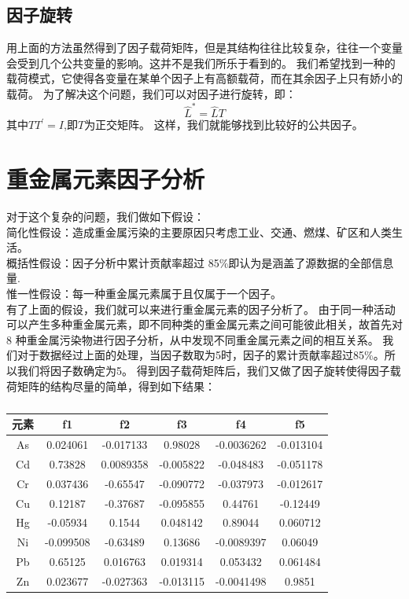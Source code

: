 \documentclass[a4paper]{article}
\begin{document}
\subsection{因子旋转}
用上面的方法虽然得到了因子载荷矩阵，但是其结构往往比较复杂，往往一个变量会受到几个公共变量的影响。这并不是我们所乐于看到的。
我们希望找到一种的载荷模式，它使得各变量在某单个因子上有高额载荷，而在其余因子上只有娇小的载荷。
为了解决这个问题，我们可以对因子进行旋转，即：
\begin{equation}
\hat L^* = \hat LT
\end{equation}
其中$TT^{\prime}=I$,即$T$为正交矩阵。
这样，我们就能够找到比较好的公共因子。
\section{重金属元素因子分析}
对于这个复杂的问题，我们做如下假设：\\
简化性假设：造成重金属污染的主要原因只考虑工业、交通、燃煤、矿区和人类生
活。\\
概括性假设：因子分析中累计贡献率超过 85\%即认为是涵盖了源数据的全部信息量. \\
惟一性假设：每一种重金属元素属于且仅属于一个因子。\\
\indent 有了上面的假设，我们就可以来进行重金属元素的因子分析了。
由于同一种活动可以产生多种重金属元素，即不同种类的重金属元素之间可能彼此相关，故首先对 8 种重金属污染物进行因子分析，从中发现不同重金属元素之间的相互关系。
我们对于数据经过上面的处理，当因子数取为5时，因子的累计贡献率超过85\%。所以我们将因子数确定为5。
得到因子载荷矩阵后，我们又做了因子旋转使得因子载荷矩阵的结构尽量的简单，得到如下结果：
\begin{table}[H]
		\centering
		\caption{}
		\label{average-contend}
		\begin{tabular}{c|ccccc}
			元素	  &   f1   &  f2  &   f3 &   f4  &   f5   \\
			\hline
			 As   &  0.024061 &   -0.017133  &    0.98028  &  -0.0036262  &  -0.013104    \\
    			 Cd   &   0.73828 &   0.0089358  &  -0.005822  &   -0.048483  &  -0.051178    \\  
    			 Cr   &  0.037436 &    -0.65547  &  -0.090772  &   -0.037973  &  -0.012617    \\
    			 Cu   &   0.12187 &    -0.37687  &  -0.095855  &     0.44761  &   -0.12449    \\
   			 Hg   &  -0.05934 &      0.1544  &   0.048142  &     0.89044  &   0.060712    \\
   			 Ni   & -0.099508 &    -0.63489  &    0.13686  &  -0.0089397  &    0.06049    \\
   			 Pb   &   0.65125 &    0.016763  &   0.019314  &    0.053432  &   0.061484    \\
   			 Zn   &  0.023677 &   -0.027363  &  -0.013115  &  -0.0041498  &     0.9851    \\
		\end{tabular}
\end{table}
\end{document}
